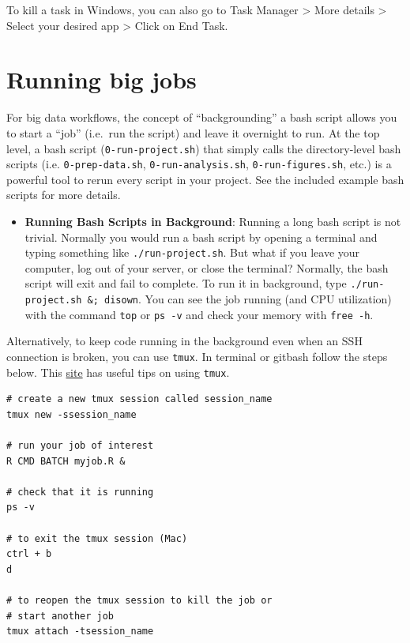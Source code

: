 \documentclass[]{book}
\providecommand{\tightlist}{%
  \setlength{\itemsep}{0pt}\setlength{\parskip}{0pt}}
\begin{document}
To kill a task in Windows, you can also go to Task Manager
\textgreater{} More details \textgreater{} Select your desired app
\textgreater{} Click on End Task.

\section{Running big jobs}\label{running-big-jobs}

For big data workflows, the concept of ``backgrounding'' a bash script
allows you to start a ``job'' (i.e.~run the script) and leave it
overnight to run. At the top level, a bash script
(\texttt{0-run-project.sh}) that simply calls the directory-level bash
scripts (i.e. \texttt{0-prep-data.sh}, \texttt{0-run-analysis.sh},
\texttt{0-run-figures.sh}, etc.) is a powerful tool to rerun every
script in your project. See the included example bash scripts for more
details.

\begin{itemize}
\tightlist
\item
  \textbf{Running Bash Scripts in Background}: Running a long bash
  script is not trivial. Normally you would run a bash script by opening
  a terminal and typing something like \texttt{./run-project.sh}. But
  what if you leave your computer, log out of your server, or close the
  terminal? Normally, the bash script will exit and fail to complete. To
  run it in background, type \texttt{./run-project.sh\ \&;\ disown}. You
  can see the job running (and CPU utilization) with the command
  \texttt{top} or \texttt{ps\ -v} and check your memory with
  \texttt{free\ -h}.
\end{itemize}

Alternatively, to keep code running in the background even when an SSH
connection is broken, you can use \texttt{tmux}. In terminal or gitbash
follow the steps below. This
\href{https://medium.com/@jeongwhanchoi/install-tmux-on-osx-and-basics-commands-for-beginners-be22520fd95e}{site}
has useful tips on using \texttt{tmux}.

\begin{verbatim}
# create a new tmux session called session_name
tmux new -ssession_name

# run your job of interest
R CMD BATCH myjob.R & 
  
# check that it is running
ps -v

# to exit the tmux session (Mac)
ctrl + b 
d

# to reopen the tmux session to kill the job or 
# start another job
tmux attach -tsession_name 
\end{verbatim}
\end{document}
